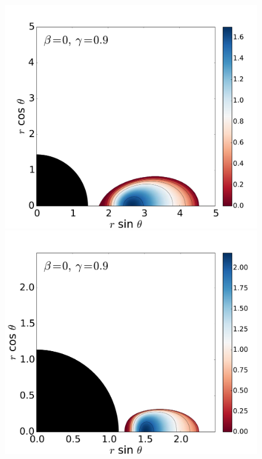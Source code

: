 \documentclass{aa}
\begin{document}
\begin{figure}
\includegraphics[scale=0.14]{figures/fig2_4_2.pdf}
\hspace{-0.2cm}
\includegraphics[scale=0.14]{figures/fig2_4_3.pdf}
\\

\end{figure}
\end{document}
